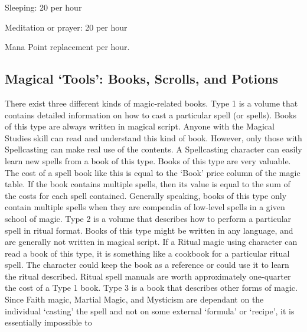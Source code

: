 \documentclass[twoside]{book}
\begin{document}
                  
                   Sleeping: 
                   20 per hour   
                  
                  
                   Meditation or prayer: 
                   20 per hour   
                  
                
              Mana Point replacement per hour.  
            
\subsection{Magical `Tools': Books, Scrolls, and
               Potions}
      There exist three different kinds of magic-related
               books.   Type 1 is a volume that contains detailed
               information on how to cast a particular spell (or spells).
               Books of this type are always written in magical script.
               Anyone with the Magical Studies skill can read and
               understand this kind of book. However, only those with
               Spellcasting can make real use of the contents. A
               Spellcasting character can easily learn new spells from a
               book of this type. Books of this type are very valuable.
               The cost of a spell book like this is equal to the
               `Book' price column of the magic table. If the
               book contains multiple spells, then its value is equal to
               the sum of the costs for each spell contained. Generally
               speaking, books of this type only contain multiple spells
               when they are compendia of low-level spells in a given
               school of magic.   Type 2 is a volume that describes how to perform a
               particular spell in ritual format. Books of this type
               might be written in any language, and are generally not
               written in magical script. If a Ritual magic using
               character can read a book of this type, it is something
               like a cookbook for a particular ritual spell. The
               character could keep the book as a reference or could use
               it to learn the ritual described. Ritual spell manuals are
               worth approximately one-quarter the cost of a Type 1 book.
                 Type 3 is a book that describes other forms of
               magic. Since Faith magic, Martial Magic, and Mysticism are
               dependant on the individual `casting' the
               spell and not on some external `formula' or
               `recipe', it is essentially impossible to
\end{document}
